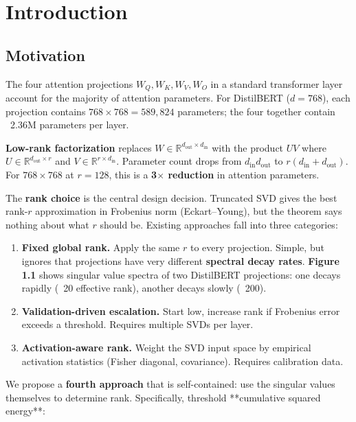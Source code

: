 
\section{Introduction}

\subsection{Motivation}

The four attention projections $W_Q, W_K, W_V, W_O$ in a standard transformer 
layer account for the majority of attention parameters. For DistilBERT 
($d = 768$), each projection contains $768 \times 768 = 589{,}824$ parameters; 
the four together contain ~2.36M parameters per layer.

\textbf{Low-rank factorization} replaces $W \in \mathbb{R}^{d_\text{out} \times d_\text{in}}$ 
with the product $U V$ where $U \in \mathbb{R}^{d_\text{out} \times r}$ and 
$V \in \mathbb{R}^{r \times d_\text{in}}$. Parameter count drops from 
$d_\text{in} d_\text{out}$ to $r (d_\text{in} + d_\text{out})$. For 
$768 \times 768$ at $r = 128$, this is a \textbf{3$\times$ reduction} in attention 
parameters.

The \textbf{rank choice} is the central design decision. Truncated SVD gives the 
best rank-$r$ approximation in Frobenius norm (Eckart--Young), but the theorem 
says nothing about what $r$ should be. Existing approaches fall into three 
categories:

\begin{enumerate}
\item \textbf{Fixed global rank.} Apply the same $r$ to every projection. Simple, but
  ignores that projections have very different \textbf{spectral decay rates}.
  \textbf{Figure 1.1} shows singular value spectra of two DistilBERT projections:
  one decays rapidly (~20 effective rank), another decays slowly (~200).

\item \textbf{Validation-driven escalation.} Start low, increase rank if Frobenius
  error exceeds a threshold. Requires multiple SVDs per layer.

\item \textbf{Activation-aware rank.} Weight the SVD input space by empirical
  activation statistics (Fisher diagonal, covariance). Requires calibration
  data.

\end{enumerate}
We propose a \textbf{fourth approach} that is self-contained: use the singular 
values themselves to determine rank. Specifically, threshold **cumulative 
squared energy**:

